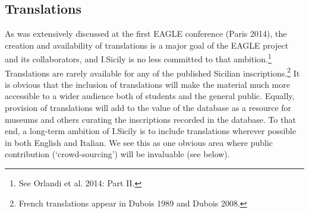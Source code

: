 \documentclass[amsthm,ebook]{saparticle}
\begin{document}
\subsection{Translations}


As was extensively discussed at the first EAGLE conference (Paris 2014), the creation and availability of translations
is a major goal of the EAGLE project and its collaborators, and I.Sicily is no less committed to that
ambition.\footnote{ See Orlandi et al. 2014: Part II.} Translations are rarely available for any of the published
Sicilian inscriptions.\footnote{ French translations appear in Dubois 1989 and Dubois 2008.} It is obvious that the
inclusion of translations will make the material much more accessible to a wider audience both of students and the
general public. Equally, provision of translations will add to the value of the database as a resource for museums and
others curating the inscriptions recorded in the database. To that end, a long-term ambition of I.Sicily is to include
translations wherever possible in both English and Italian. We see this as one obvious area where public contribution
(`crowd-sourcing') will be invaluable (see below).
\end{document}
